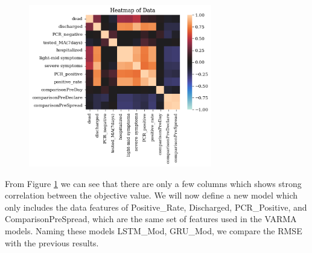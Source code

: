 \begin{figure}[!ht]
    \centering
    \includegraphics[width=8cm]{images/Heatmap_of_Data.png}
    \label{fig:Heatmap}
\end{figure}

From Figure \ref{fig:Heatmap} we can see that there are only a few columns which shows strong correlation between the objective value. We will now define a new model which only includes the data features of Positive\_Rate, Discharged, PCR\_Positive, and ComparisonPreSpread, which are the same set of features used in the VARMA models. Naming these models LSTM\_Mod, GRU\_Mod, we compare the RMSE with the previous results. 

